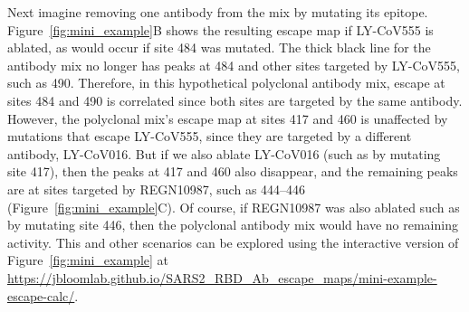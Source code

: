 \documentclass[9pt,twocolumn,twoside]{gsajnl_modified}
\begin{document}
Next imagine removing one antibody from the mix by mutating its epitope.
Figure~\ref{fig:mini_example}B shows the resulting escape map if LY-CoV555 is ablated, as would occur if site 484 was mutated.
The thick black line for the antibody mix no longer has peaks at 484 and other sites targeted by LY-CoV555, such as 490.
Therefore, in this hypothetical polyclonal antibody mix, escape at sites 484 and 490 is correlated since both sites are targeted by the same antibody.
However, the polyclonal mix's escape map at sites 417 and 460 is unaffected by mutations that escape LY-CoV555, since they are targeted by a different antibody, LY-CoV016.
But if we also ablate LY-CoV016 (such as by mutating site 417), then the peaks at 417 and 460 also disappear, and the remaining peaks are at sites targeted by REGN10987, such as 444--446 (Figure~\ref{fig:mini_example}C).
Of course, if REGN10987 was also ablated such as by mutating site 446, then the polyclonal antibody mix would have no remaining activity.
This and other scenarios can be explored using the interactive version of Figure~\ref{fig:mini_example} at \url{https://jbloomlab.github.io/SARS2_RBD_Ab_escape_maps/mini-example-escape-calc/}.
\end{document}
